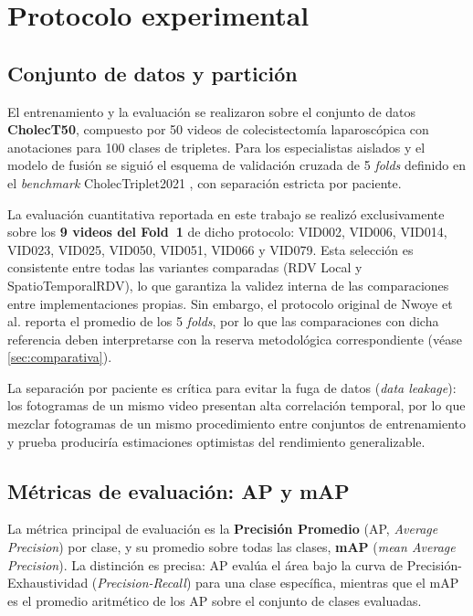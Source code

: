 \documentclass[11pt]{article}
\begin{document}
\section{Protocolo experimental}
\label{sec:protocolo}

\subsection{Conjunto de datos y partición}
\label{sec:particion}

El entrenamiento y la evaluación se realizaron sobre el conjunto de datos \textbf{CholecT50}, compuesto por 50 videos de colecistectomía laparoscópica con anotaciones para 100 clases de tripletes. Para los especialistas aislados y el modelo de fusión se siguió el esquema de validación cruzada de 5 \emph{folds} definido en el \emph{benchmark} CholecTriplet2021 \cite{nwoye2023cholectriplet}, con separación estricta por paciente.

La evaluación cuantitativa reportada en este trabajo se realizó exclusivamente sobre los \textbf{9 videos del Fold~1} de dicho protocolo: VID002, VID006, VID014, VID023, VID025, VID050, VID051, VID066 y VID079. Esta selección es consistente entre todas las variantes comparadas (RDV Local y SpatioTemporalRDV), lo que garantiza la validez interna de las comparaciones entre implementaciones propias. Sin embargo, el protocolo original de Nwoye et al. \cite{nwoye2022rendezvous} reporta el promedio de los 5 \emph{folds}, por lo que las comparaciones con dicha referencia deben interpretarse con la reserva metodológica correspondiente (véase \cref{sec:comparativa}).

La separación por paciente es crítica para evitar la fuga de datos (\emph{data leakage}): los fotogramas de un mismo video presentan alta correlación temporal, por lo que mezclar fotogramas de un mismo procedimiento entre conjuntos de entrenamiento y prueba produciría estimaciones optimistas del rendimiento generalizable.

\subsection{Métricas de evaluación: AP y mAP}
\label{sec:metricas}

La métrica principal de evaluación es la \textbf{Precisión Promedio} (AP, \emph{Average Precision}) por clase, y su promedio sobre todas las clases, \textbf{mAP} (\emph{mean Average Precision}). La distinción es precisa: AP evalúa el área bajo la curva de Precisión-Exhaustividad (\emph{Precision-Recall}) para una clase específica, mientras que el mAP es el promedio aritmético de los AP sobre el conjunto de clases evaluadas.
\end{document}

